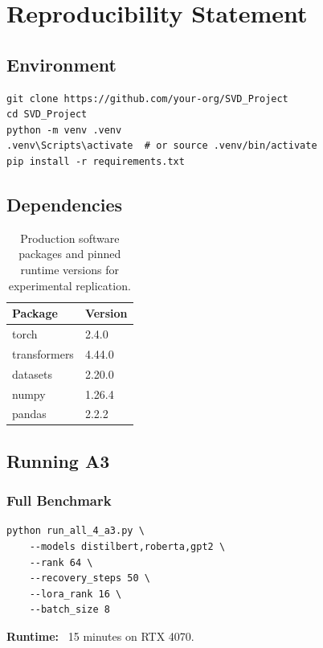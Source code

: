 
\section{Reproducibility Statement}

\subsection{Environment}

\begin{lstlisting}
git clone https://github.com/your-org/SVD_Project
cd SVD_Project
python -m venv .venv
.venv\Scripts\activate  # or source .venv/bin/activate
pip install -r requirements.txt
\end{lstlisting}

\subsection{Dependencies}

\begin{table}[H]
\centering
\small
\begin{tabular}{ll}
\toprule
\textbf{Package} & \textbf{Version} \\
\midrule
torch & 2.4.0 \\
transformers & 4.44.0 \\
datasets & 2.20.0 \\
numpy & 1.26.4 \\
pandas & 2.2.2 \\
\bottomrule
\end{tabular}
\caption{Production software packages and pinned runtime versions for experimental replication.}
\label{tab:repro_dependencies}
\end{table}

\subsection{Running A3}

\subsubsection{Full Benchmark}

\begin{lstlisting}
python run_all_4_a3.py \
    --models distilbert,roberta,gpt2 \
    --rank 64 \
    --recovery_steps 50 \
    --lora_rank 16 \
    --batch_size 8
\end{lstlisting}

\textbf{Runtime:} ~15 minutes on RTX 4070.

